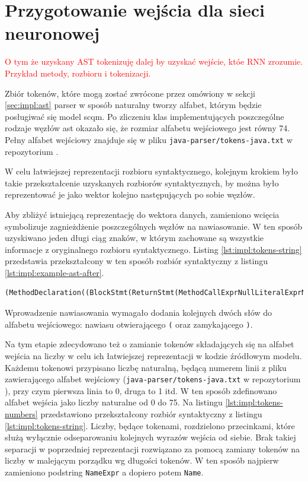 \documentclass[12pt]{report}
\begin{document}
\section{Przygotowanie wejścia dla sieci neuronowej}
\label{sec:impl:rnn-input}
\textcolor{red}{O tym że uzyskany AST tokenizuję dalej by uzyskać wejście, któe RNN zrozumie. Przykład metody, rozbioru i tokenizacji.}

Zbiór tokenów, które mogą zostać zwrócone przez omówiony w sekcji \ref{sec:impl:ast} parser w sposób naturalny tworzy alfabet, którym będzie posługiwać się model \gls{scqm}. Po zliczeniu klas implementujących poszczególne rodzaje węzłów \gls{ast} okazało się, że rozmiar alfabetu wejściowego jest równy 74. Pełny alfabet wejściowy znajduje się w pliku \texttt{java-parser/tokens-java.txt} w repozytorium \cite{fracz:refactor-extractor}.

W celu łatwiejszej reprezentacji rozbioru syntaktycznego, kolejnym krokiem było takie przekształcenie uzyskanych rozbiorów syntaktycznych, by można było reprezentować je jako wektor kolejno następujących po sobie węzłów.

Aby zbliżyć istniejącą reprezentację do wektora danych, zamieniono wcięcia symbolizuje zagnieżdżenie poszczególnych węzłów na nawiasowanie. W ten sposób uzyskiwano jeden długi ciąg znaków, w którym zachowane są wszystkie informacje z oryginalnego rozbioru syntaktycznego. Listing \ref{lst:impl:tokens-string} przedstawia przekształcony w ten sposób rozbiór syntaktyczny z listingu \ref{lst:impl:example-ast-after}.

\begin{lstlisting}[frame=single,caption={Reprezentacja rozbioru syntaktycznego metody w postaci ciągu znaków},captionpos=b,label={lst:impl:tokens-string}]
(MethodDeclaration((BlockStmt(ReturnStmt(MethodCallExprNullLiteralExprNameExpr(SimpleName)SimpleName)))ClassOrInterfaceType(SimpleName)SimpleNameMarkerAnnotationExpr(Name)))
\end{lstlisting}

Wprowadzenie nawiasowania wymagało dodania kolejnych dwóch słów do alfabetu wejściowego: nawiasu otwierającego \texttt{(} oraz zamykającego \texttt{)}.

Na tym etapie zdecydowano też o zamianie tokenów składających się na alfabet wejścia na liczby w celu ich łatwiejszej reprezentacji w kodzie źródłowym modelu. Każdemu tokenowi przypisano liczbę naturalną, będącą numerem linii z pliku zawierającego alfabet wejściowy (\texttt{java-parser/tokens-java.txt} w repozytorium \cite{fracz:refactor-extractor}), przy czym pierwsza linia to 0, druga to 1 itd. W ten sposób zdefinowano alfabet wejścia jako liczby naturalne od 0 do 75. Na listingu \ref{lst:impl:tokens-numbers} przedstawiono przekształcony rozbiór syntaktyczny z listingu \ref{lst:impl:tokens-string}. Liczby, będące tokenami, rozdzielono przecinkami, które służą wyłącznie odseparowaniu kolejnych wyrazów wejścia od siebie. Brak takiej separacji w poprzedniej reprezentacji rozwiązano za pomocą zamiany tokenów na liczby w malejącym porządku wg długości tokenów. W ten sposób najpierw zamieniono podstring \texttt{NameExpr} a dopiero potem \texttt{Name}.
\end{document}
